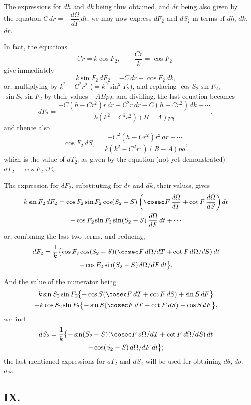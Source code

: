 \documentclass[11pt,a4paper]{book}
\begin{document}
The expressions for $dh$ and $dk$ being thus obtained, and $dr$ being also given by the equation $C\,dr = -\dfrac{d\Omega}{dF}\,dt$, we may now express $dF_2$ and $dS_2$ in terms of $dh$, $dk$, $dr$.

In fact, the equations
\[
Cr = k\cos F_2, \qquad \frac{Cr}{k} = \cos F_2,
\]
give immediately
\[
k\sin F_2\,dF_2 = -C\,dr + \cos F_2\,dk,
\]
or, multiplying by $k^2 - C^2r^2$ ($= k^2\sin^2 F_2$), and replacing $\cos S_2\sin F_2$, $\sin S_2\sin F_2$ by their values $-ABpq$, and dividing, the last equation becomes
\[
dF_2 = \frac{-C(h-Cr^2)r\,dr + C^2r\,dr - C(h-Cr^2)\,dk + \cdots}{k(k^2-C^2r^2)(B-A)pq},
\]
and thence also
\[
\cos F_2\,dS_2 = \frac{-C^2(h-Cr^2)r^2\,dr + \cdots}{k(k^2-C^2r^2)(B-A)pq},
\]
which is the value of $dT_2$, as given by the equation (not yet demonstrated) $dT_2 = \cos F_2\,dF_2$.

The expression for $dF_2$, substituting for $dr$ and $dk$, their values, gives
\begin{multline*}
k\sin F_2\,dF_2 = \cos F_2\sin F_2\cos(S_2-S)\left(\cosec F\,\frac{d\Omega}{dT} + \cot F\,\frac{d\Omega}{dS}\right)dt \\
- \cos F_2\sin F_2\sin(S_2-S)\,\frac{d\Omega}{dF}\,dt + \cdots
\end{multline*}
or, combining the last two terms, and reducing,
\begin{multline*}
dF_2 = \frac{1}{k}\bigl\{\cos F_2\cos(S_2-S)(\cosec F\,d\Omega/dT + \cot F\,d\Omega/dS)\,dt \\
- \cos F_2\sin(S_2-S)\,d\Omega/dF\,dt\bigr\}.
\end{multline*}

And the value of the numerator being
\begin{multline*}
k\sin S_2\sin F_2\bigl\{-\cos S(\cosec F\,dT + \cot F\,dS) + \sin S\,dF\bigr\} \\
+ k\cos S_2\sin F_2\bigl\{-\sin S(\cosec F\,dT + \cot F\,dS) - \cos S\,dF\bigr\},
\end{multline*}
we find
\begin{multline*}
dS_2 = \frac{1}{k}\bigl\{-\sin(S_2-S)(\cosec F\,d\Omega/dT + \cot F\,d\Omega/dS)\,dt \\
+ \cos(S_2-S)\,d\Omega/dF\,dt\bigr\};
\end{multline*}
the last-mentioned expressions for $dT_2$ and $dS_2$ will be used for obtaining $d\theta$, $d\sigma$, $d\phi$.

\subsection*{IX.}
\end{document}

